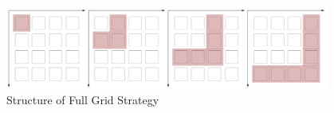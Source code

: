 \documentclass[final,hyperref={pdfpagelabels=false},table]{beamer}
\begin{document}
\begin{frame}
\begin{columns}[T]
\begin{column}{\colCWidth}





\begin{figure}[h]
\centering
\includegraphics[width=\textwidth]{../gfx/Grids04.png}
\caption{Structure of Full Grid Strategy}
\end{figure}




\end{column}
\begin{column}{\colCWidth}



\end{column}
\end{columns}
\end{frame}
\end{document}
